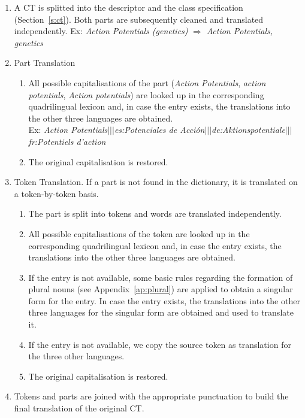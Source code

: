 \documentclass[a4paper,11pt]{article}
\begin{document}
	\begin{enumerate}
		\item A CT is splitted into the descriptor and the class specification (Section~\ref{s:ct}). Both parts are subsequently cleaned and translated independently. 
		Ex: \emph{Action Potentials (genetics)} $\Rightarrow$ \emph{Action Potentials, genetics}
		\item Part Translation
		\begin{enumerate}[label*=\arabic*.]
			\item  All possible capitalisations of the part (\emph{Action Potentials}, \emph{action potentials}, \emph{Action potentials}) are looked up in the corresponding quadrilingual lexicon and, in case the entry exists, the translations into the other three languages are obtained. \\ 
			Ex: \emph{Action Potentials$|||$es:Potenciales de Acción$|||$de:Aktionspotentiale$|||$fr:Potentiels d'action}
			\item The original capitalisation is restored.
		\end{enumerate}
		
		\item Token Translation. If a part is not found in the dictionary, it is translated on a token-by-token basis.
		\begin{enumerate}[label*=\arabic*.]
			\item The part is split into tokens and words are translated independently.  
			\item  All possible capitalisations of the token are looked up in the corresponding quadrilingual lexicon and, in case the entry exists, the translations into the other three languages are obtained.
			\item If the entry is not available, some basic rules regarding the formation of plural nouns (see Appendix~\ref{ap:plural}) are applied to obtain a singular form for the entry. In case the entry exists, the translations into the other three languages for the singular form are obtained and used to translate it.
			\item If the entry is not available, we copy the source token as translation for the three other languages.
			\item The original capitalisation is restored.
		\end{enumerate}
		
		\item Tokens and parts are joined with the appropriate punctuation to build the final translation of the original CT.
		
	\end{enumerate}
	
\end{document}
